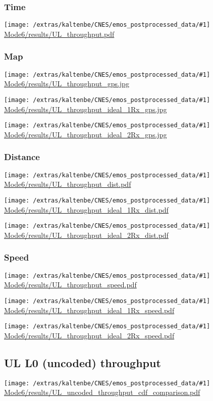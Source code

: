 \documentclass[a4paper,10pt]{article}
\newcommand{\printfile}[1]{
 \begin{minipage}{8cm}
  \centering
  \texttt{[image: /extras/kaltenbe/CNES/emos\_postprocessed\_data/\#1]}
  \url{#1}

 \end{minipage}
}
\begin{document}
\subsubsection{Time}
\printfile{Mode6/results/UL_throughput.pdf}

\subsubsection{Map}
\printfile{Mode6/results/UL_throughput_gps.jpg}

\printfile{Mode6/results/UL_throughput_ideal_1Rx_gps.jpg}
\printfile{Mode6/results/UL_throughput_ideal_2Rx_gps.jpg}

\subsubsection{Distance}
\printfile{Mode6/results/UL_throughput_dist.pdf}

\printfile{Mode6/results/UL_throughput_ideal_1Rx_dist.pdf}
\printfile{Mode6/results/UL_throughput_ideal_2Rx_dist.pdf}


\subsubsection{Speed}
\printfile{Mode6/results/UL_throughput_speed.pdf}

\printfile{Mode6/results/UL_throughput_ideal_1Rx_speed.pdf}
\printfile{Mode6/results/UL_throughput_ideal_2Rx_speed.pdf}



\subsection{UL L0 (uncoded) throughput}

\printfile{Mode6/results/UL_uncoded_throughput_cdf_comparison.pdf}
\end{document}
